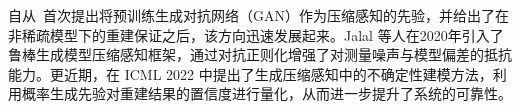 \documentclass[lang=cn,newtx,10pt,scheme=chinese,chinesefont=nofont,citestyle=gb7714-2015, bibstyle=gb7714-2015]{elegantbook}
\begin{document}
\begin{refsection}
自从~\cite{borajalalpricedimakis17}首次提出将预训练生成对抗网络（GAN）作为压缩感知的先验，并给出了在非稀疏模型下的重建保证之后，该方向迅速发展起来。Jalal 等人在2020年\cite{jalal2020robust}引入了鲁棒生成模型压缩感知框架，通过对抗正则化增强了对测量噪声与模型偏差的抵抗能力。更近期，\cite{zhang2022uncertainty}在 ICML 2022 中提出了生成压缩感知中的不确定性建模方法，利用概率生成先验对重建结果的置信度进行量化，从而进一步提升了系统的可靠性。










\printbibliography[heading=subbibliography, title={本章参考文献}]
\end{refsection}
\end{document}
